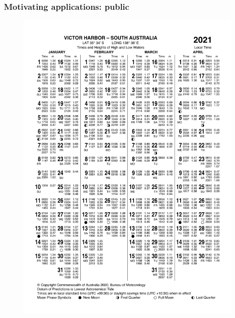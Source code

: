 \begin{frame}
\frametitle{Motivating applications: public}
\begin{minipage}{0.45\textwidth}
    \begin{figure}      
    \includegraphics[height=\textheight]{figures/images/IDO59001_2021_SA_TP006.pdf}
    \end{figure}
\end{minipage}
\hfill
\begin{minipage}{0.45\textwidth}
    \begin{figure}      

\end{figure}
\end{minipage}
\end{frame}
